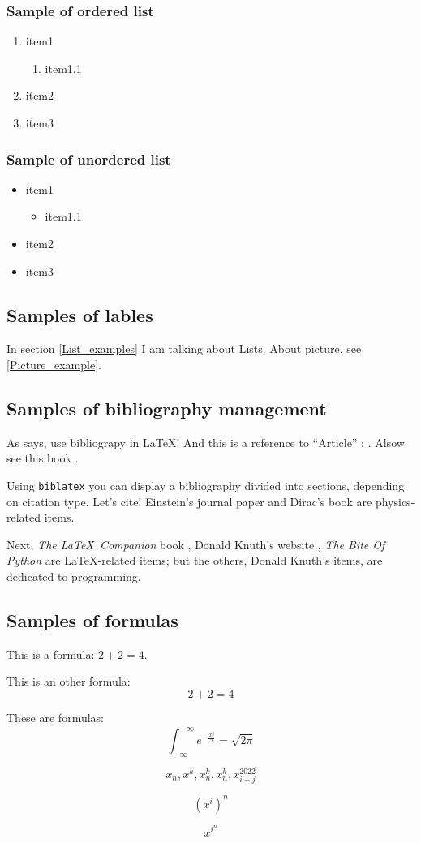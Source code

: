 \subsubsection{Sample of ordered list}
\begin{enumerate}
    \item item1
        \begin{enumerate}
            \item item1.1
        \end{enumerate}
    \item item2
    \item item3
\end{enumerate}

\subsubsection{Sample of unordered list}
\begin{itemize}
    \item item1
        \begin{itemize}
            \item item1.1
        \end{itemize}
    \item item2
    \item item3
\end{itemize}

\subsection{Samples of lables}
In section \ref{List_examples} I am talking about Lists. About picture, see \ref{Picture_example}.

\subsection{Samples of bibliography management}
As \parencite{example-book} says, use bibliograpy in \LaTeX{}! And this is a reference to ``Article'' : \parencite{example-article}. Alsow see this book \parencite{example-incollection}.

Using \texttt{biblatex} you can display a bibliography divided into sections, depending on citation type.  Let's cite! Einstein's journal paper \parencite{example-article} and Dirac's book \parencite{example-book} are physics-related items.

Next, \textit{The \LaTeX\ Companion} book \parencite{example-book}, Donald Knuth's website \parencite{example-online}, \textit{The Bite Of Python} \parencite{chitlur2014} are \LaTeX-related items; but the others, Donald Knuth's items, \cite{example-inbook} are dedicated to programming.

\subsection{Samples of formulas}
This is a formula: $2 + 2 = 4$.

This is an other formula:
\[2 + 2 = 4\]

These are formulas:
\[\int_{-\infty}^{+\infty} e^{-\frac{x^2}{2}} = \sqrt{2 \pi}\]

\[x_n, x^k, x_n^k, x^k_n, x_{i + j}^{2022}\]

\[(x^i)^n\]

\[x^{i^n}\]

